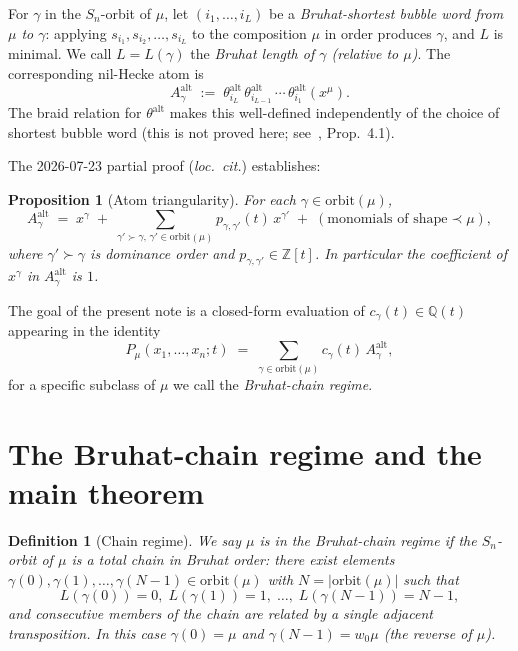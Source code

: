 \documentclass[11pt]{article}
\newtheorem{proposition}[theorem]{Proposition}
\newtheorem{definition}[theorem]{Definition}
\newcommand{\Aalt}{A^{\mathrm{alt}}}
\newcommand{\thalt}{\theta^{\mathrm{alt}}}
\begin{document}
For $\gamma$ in the $S_n$-orbit of $\mu$, let $(i_1, \ldots, i_L)$ be a
\emph{Bruhat-shortest bubble word from $\mu$ to $\gamma$}: applying
$s_{i_1}, s_{i_2}, \ldots, s_{i_L}$ to the composition $\mu$ in order
produces $\gamma$, and $L$ is minimal.  We call $L = L(\gamma)$ the
\emph{Bruhat length of $\gamma$ (relative to $\mu$)}.  The corresponding
nil-Hecke atom is
\begin{equation}\label{eq:Aalt-def}
  \Aalt_\gamma \;:=\; \thalt_{i_L}\, \thalt_{i_{L-1}}\, \cdots\, \thalt_{i_1}(x^\mu).
\end{equation}
The braid relation for $\thalt$ makes this well-defined
independently of the choice of shortest bubble word (this is not proved here;
see~\cite{clio-0723}, Prop.~4.1).

The 2026-07-23 partial proof (\emph{loc.\ cit.}) establishes:

\begin{proposition}[Atom triangularity]\label{prop:atomtriang}
For each $\gamma \in \mathrm{orbit}(\mu)$,
\[
  \Aalt_\gamma \;=\; x^\gamma \;+\; \sum_{\gamma' \succ \gamma,\, \gamma' \in \mathrm{orbit}(\mu)} p_{\gamma, \gamma'}(t)\, x^{\gamma'}
    \;+\; (\text{monomials of shape} \prec \mu),
\]
where $\gamma' \succ \gamma$ is dominance order and $p_{\gamma, \gamma'} \in \mathbb Z[t]$.
In particular the coefficient of $x^\gamma$ in $\Aalt_\gamma$ is $1$.
\end{proposition}

The goal of the present note is a closed-form evaluation of
$c_\gamma(t) \in \mathbb Q(t)$ appearing in the identity
\begin{equation}\label{eq:atoms-decomp}
  P_\mu(x_1, \ldots, x_n; t) \;=\; \sum_{\gamma \in \mathrm{orbit}(\mu)} c_\gamma(t)\, \Aalt_\gamma,
\end{equation}
for a specific subclass of $\mu$ we call the \emph{Bruhat-chain regime}.

\section{The Bruhat-chain regime and the main theorem}

\begin{definition}[Chain regime]\label{def:chain}
We say $\mu$ is in the \emph{Bruhat-chain regime} if the $S_n$-orbit of $\mu$
is a total chain in Bruhat order: there exist elements
$\gamma(0), \gamma(1), \ldots, \gamma(N-1) \in \mathrm{orbit}(\mu)$ with
$N = |\mathrm{orbit}(\mu)|$ such that
\[
  L(\gamma(0)) = 0, \; L(\gamma(1)) = 1, \; \ldots, \; L(\gamma(N-1)) = N-1,
\]
and consecutive members of the chain are related by a single adjacent
transposition.  In this case $\gamma(0) = \mu$ and $\gamma(N-1) = w_0 \mu$
(the reverse of $\mu$).
\end{definition}
\end{document}
